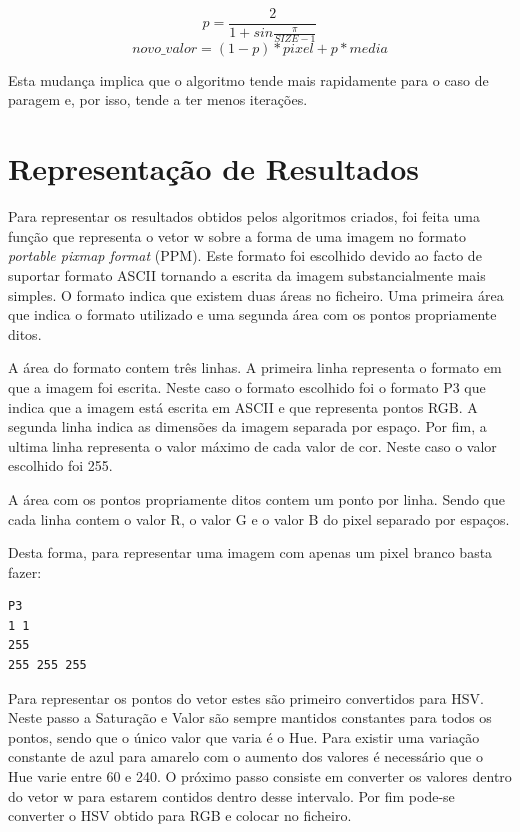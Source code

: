 \documentclass[a4paper]{report}
\begin{document}
\[ p = \frac{2}{1 + sin{\frac{\pi}{SIZE - 1}}} \]
\[novo\_valor = (1-p) * pixel + p * media \]

Esta mudança implica que o algoritmo tende mais rapidamente para o caso de
paragem e, por isso, tende a ter menos iterações.


\chapter{Representação de Resultados}

Para representar os resultados obtidos pelos algoritmos criados, foi feita uma
função que representa o vetor w sobre a forma de uma imagem no formato
\textit{portable pixmap format} (PPM). Este formato foi escolhido devido ao
facto de suportar formato ASCII tornando a escrita da imagem substancialmente
mais simples. O formato indica que existem duas áreas no ficheiro. Uma primeira
área que indica o formato utilizado e uma segunda área com os pontos
propriamente ditos.

A área do formato contem três linhas. A primeira linha representa o formato em
que a imagem foi escrita. Neste caso o formato escolhido foi o formato P3 que
indica que a imagem está escrita em ASCII e que representa pontos RGB. A segunda
linha indica as dimensões da imagem separada por espaço. Por fim, a ultima linha
representa o valor máximo de cada valor de cor. Neste caso o valor escolhido
foi 255.

A área com os pontos propriamente ditos contem um ponto por linha. Sendo que
cada linha contem o valor R, o valor G e o valor B do pixel separado por espaços.

Desta forma, para representar uma imagem com apenas um pixel branco basta fazer:
\begin{verbatim}
P3
1 1
255
255 255 255
\end{verbatim}

Para representar os pontos do vetor estes são primeiro convertidos para HSV.
Neste passo a Saturação e Valor são sempre mantidos constantes para todos os
pontos, sendo que o único valor que varia é o Hue. Para existir uma variação
constante de azul para amarelo com o aumento dos valores é necessário que o Hue
varie entre 60 e 240. O próximo passo consiste em converter os valores dentro do
vetor w para estarem contidos dentro desse intervalo. Por fim pode-se converter
o HSV obtido para RGB e colocar no ficheiro.
\end{document}
